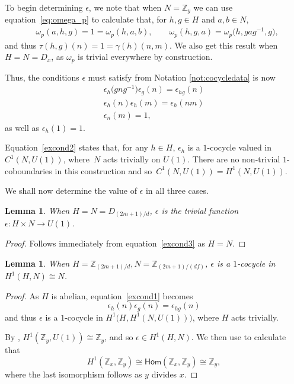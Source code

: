 \documentclass[10pt,a4paper]{amsart}
\numberwithin{equation}{section}
\newtheorem{Lemma}[Theorem]{Lemma}
\newcommand{\Hom}{\mathsf{Hom}}
\newcommand{\mZ}{\mathbb{Z}}
\begin{document}
To begin determining $\epsilon$, we note that when $N=\mZ_y$ we can use equation~\eqref{eq:omega_p} to calculate that, for $h,g \in H$ and $a,b \in N$,
\begin{align*}
 &\omega_p(a,h,g) = 1 = \omega_p(h,a,b) ,\qquad
 \omega_p(h,g,a) = \omega_p\big(h,gag^{-1},g\big) ,
\end{align*}
and thus $\tau(h,g)(n) = 1 = \gamma(h)(n,m)$. We also get this result when $H=N=D_x$, as $\omega_p$ is trivial everywhere by construction.

Thus, the conditions $\epsilon$ must satisfy from Notation \ref{not:cocycledata} is now
\begin{gather}
 \epsilon_h\big(gng^{-1}\big)\epsilon_g(n)= \epsilon_{hg}(n)\label{excond1}\\
 \epsilon_h(n)\epsilon_h(m) = \epsilon_h(nm) \label{excond2}\\
 \epsilon_n(m) = 1 \label{excond3},
\end{gather}
as well as $\epsilon_h(1)=1$.

Equation~\eqref{excond2} states that, for any $h\in H$, $\epsilon_h$ is a $1$-cocycle valued in $C^1(N,U(1))$, where~$N$ acts trivially on $U(1)$. There are no non-trivial $1$-coboundaries in this construction and so~$C^1(N,U(1))=H^1(N,U(1))$.

We shall now determine the value of $\epsilon$ in all three cases.

\begin{Lemma}
 When $H=N = D_{(2m+1)/d}$, $\epsilon$ is the trivial function $\epsilon\colon H\times N \to U(1)$.
\end{Lemma}
\begin{proof}
 Follows immediately from equation~\eqref{excond3} as $H=N$.
\end{proof}

\begin{Lemma}
 When $H=\mZ_{(2m+1)/d},N=\mZ_{(2m+1)/(df)}$, $\epsilon$ is a $1$-cocycle in $H^1(H,N)\cong N$.
\end{Lemma}
\begin{proof}
 As $H$ is abelian, equation~\eqref{excond1} becomes
 \begin{equation}\label{excond4}
 \epsilon_h(n)\epsilon_g(n) = \epsilon_{hg}(n)
 \end{equation}
 and thus $\epsilon$ is a $1$-cocycle in $H^1\big(H,H^1(N,U(1))\big)$, where $H$ acts trivially.

 By \cite[equation~2.3.13]{dWP}, $H^1(\mZ_{y},U(1)) \cong \mZ_{y}$, and so $\epsilon \in H^1(H,N)$.
 We then use \cite[Theorem~3.6.5, Corollary 3.3.11, Example 6.2.3]{Wei} to calculate that
 \[H^1(\mZ_x,\mZ_y) \cong \Hom(\mZ_x,\mZ_y)\cong \mZ_y,\]
 where the last isomorphism follows as $y$ divides $x$.
\end{proof}
\end{document}
